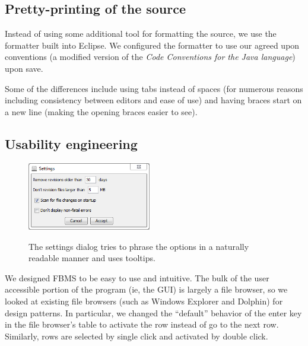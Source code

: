 \documentclass[12pt,a4paper]{article}
\begin{document}
\subsection{Pretty-printing of the source}
Instead of using some additional tool for formatting the source, we use the formatter built into Eclipse\cite{eclipse}. We configured the formatter to use our agreed upon conventions (a modified version of the \textit{Code Conventions for the Java language}\cite{conventions}) upon save.

Some of the differences include using tabs instead of spaces (for numerous reasons including consistency between editors and ease of use) and having braces start on a new line (making the opening braces easier to see).

\subsection{Usability engineering}
\begin{figure}
\vspace{-20pt}
\begin{center}
\includegraphics[width=0.48\textwidth]{images/settings.png}
\end{center}
\footnotesize{The settings dialog tries to phrase the options in a naturally readable manner and uses tooltips.}
\end{figure}

We designed FBMS to be easy to use and intuitive. The bulk of the user accessible portion of the program (ie, the GUI) is largely a file browser, so we looked at existing file browsers (such as Windows Explorer\cite{explorer} and Dolphin\cite{dolphin}) for design patterns. In particular, we changed the ``default'' behavior of the enter key in the file browser's table to activate the row instead of go to the next row. Similarly, rows are selected by single click and activated by double click.
\end{document}
